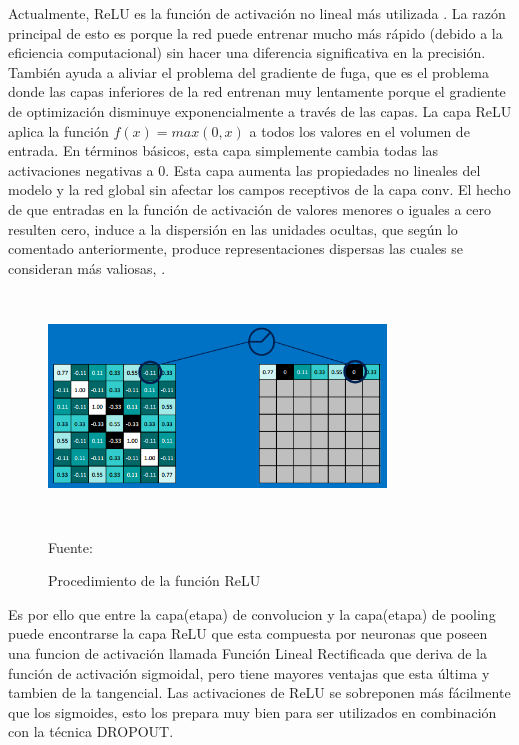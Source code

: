		Actualmente, ReLU es la función de activación no lineal más utilizada \citep{cs231n}. La razón principal de esto es porque la red puede entrenar mucho más rápido (debido a la eficiencia computacional) sin hacer una diferencia significativa en la precisión. También ayuda a aliviar el problema del gradiente de fuga, que es el problema donde las capas inferiores de la red entrenan muy lentamente porque el gradiente de optimización	disminuye exponencialmente a través de las capas. La capa ReLU aplica la función ${f(x)} = {max (0, x)} $ a todos los valores en el volumen de entrada. En términos básicos, esta capa simplemente cambia todas las activaciones negativas a 0. Esta capa aumenta las propiedades no lineales del modelo y la red global sin afectar los campos receptivos de la capa conv. El hecho de que entradas en la función de activación de valores menores o iguales a cero resulten cero, induce a la dispersión en las unidades ocultas, que según lo comentado anteriormente, produce representaciones dispersas las cuales se consideran más valiosas, \citep{RELU}. 
		
		\begin{figure}[H]
		\begin{center}
		\includegraphics[width=0.8\textwidth, height=6cm]{images/marcoteorico/relu}
		\end{center}
		\begin{center}
		\caption{\small{Procedimiento de la función ReLU}}
		\vskip -0.2cm  
		{\small{Fuente: \citep{Rohrer}}}
		\end{center}
		\vspace{-1.5em}
		\end{figure}
		\vskip 0.4cm
		
		Es por ello que entre la capa(etapa) de convolucion y la capa(etapa) de pooling puede encontrarse la capa ReLU que esta compuesta por neuronas que poseen una funcion de activación llamada Función Lineal Rectificada que deriva de la función de activación sigmoidal, pero tiene mayores ventajas que esta última y tambien de la tangencial. Las activaciones de ReLU se sobreponen más fácilmente que los sigmoides, esto los prepara muy bien para ser utilizados en combinación con la técnica DROPOUT.
		

